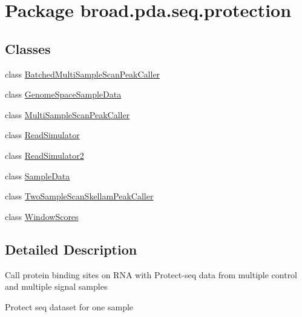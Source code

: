 \hypertarget{namespacebroad_1_1pda_1_1seq_1_1protection}{\section{Package broad.\+pda.\+seq.\+protection}
\label{namespacebroad_1_1pda_1_1seq_1_1protection}
}
\subsection*{Classes}
\begin{DoxyCompactItemize}
\item 
class \hyperlink{classbroad_1_1pda_1_1seq_1_1protection_1_1_batched_multi_sample_scan_peak_caller}{Batched\+Multi\+Sample\+Scan\+Peak\+Caller}
\item 
class \hyperlink{classbroad_1_1pda_1_1seq_1_1protection_1_1_genome_space_sample_data}{Genome\+Space\+Sample\+Data}
\item 
class \hyperlink{classbroad_1_1pda_1_1seq_1_1protection_1_1_multi_sample_scan_peak_caller}{Multi\+Sample\+Scan\+Peak\+Caller}
\item 
class \hyperlink{classbroad_1_1pda_1_1seq_1_1protection_1_1_read_simulator}{Read\+Simulator}
\item 
class \hyperlink{classbroad_1_1pda_1_1seq_1_1protection_1_1_read_simulator2}{Read\+Simulator2}
\item 
class \hyperlink{classbroad_1_1pda_1_1seq_1_1protection_1_1_sample_data}{Sample\+Data}
\item 
class \hyperlink{classbroad_1_1pda_1_1seq_1_1protection_1_1_two_sample_scan_skellam_peak_caller}{Two\+Sample\+Scan\+Skellam\+Peak\+Caller}
\item 
class \hyperlink{classbroad_1_1pda_1_1seq_1_1protection_1_1_window_scores}{Window\+Scores}
\end{DoxyCompactItemize}


\subsection{Detailed Description}
Call protein binding sites on R\+N\+A with Protect-\/seq data from multiple control and multiple signal samples

Protect seq dataset for one sample 